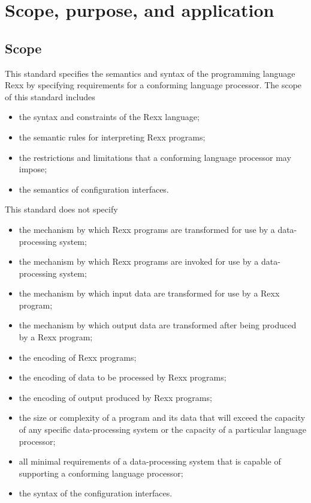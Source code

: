\hypertarget{scope-purpose-and-application}{%
\chapter{Scope, purpose, and
application}\label{scope-purpose-and-application}}

\hypertarget{scope}{%
\section{Scope}\label{scope}}

This standard specifies the semantics and syntax of the programming
language Rexx by specifying requirements for a conforming language
processor. The scope of this standard includes

\begin{itemize}
\item
  the syntax and constraints of the Rexx language;
\item
  the semantic rules for interpreting Rexx programs;
\item
  the restrictions and limitations that a conforming language processor
  may impose;
\item
  the semantics of configuration interfaces.
\end{itemize}

This standard does not specify

\begin{itemize}
\item
  the mechanism by which Rexx programs are transformed for use by a
  data-processing system;
\item
  the mechanism by which Rexx programs are invoked for use by a
  data-processing system;
\item
  the mechanism by which input data are transformed for use by a Rexx
  program;
\item
  the mechanism by which output data are transformed after being
  produced by a Rexx program;
\item
  the encoding of Rexx programs;
\item
  the encoding of data to be processed by Rexx programs;
\item
  the encoding of output produced by Rexx programs;
\item
  the size or complexity of a program and its data that will exceed the
  capacity of any specific data-processing system or the capacity of a
  particular language processor;
\item
  all minimal requirements of a data-processing system that is capable
  of supporting a conforming language processor;
\item
  the syntax of the configuration interfaces.
\end{itemize}


